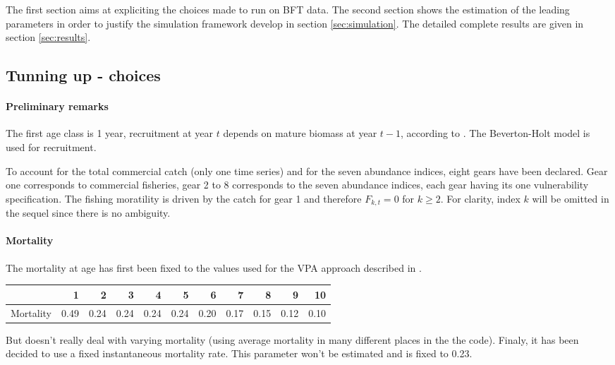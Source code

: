 The first section  aims at expliciting the choices made  to run \iscam
on BFT  data. The second section  shows the estimation of  the leading
parameters in  order to  justify the  simulation framework  develop in
section \ref{sec:simulation}. The detailed  complete results are given
in section \ref{sec:results}.




\subsection{Tunning up \iscam - choices}

\paragraph{Preliminary remarks}
The first age class is 1 year, recruitment at year $t$ depends on
mature  biomass  at  year  $t-1$,  according  to  \cite{tuna2012}.  The
Beverton-Holt model is used for recruitment.


To account for the total commercial catch (only one time series) and
for the seven abundance indices,  eight gears have been declared. Gear
one corresponds  to commercial fisheries,  gear 2 to 8  corresponds to
the seven  abundance indices, each  gear having its  one vulnerability
specification. The fishing moratility is  driven by the catch for gear
1 and  therefore $F_{k,t}=0$ for  $k \geq  2$. For clarity,  index $k$
will be omitted in the sequel since there is no ambiguity.

\paragraph{Mortality}
The mortality at age has first been fixed to  the values used for the VPA approach
described in \cite{tuna2012}. 
\begin{table}[ht]
\centering
\begin{tabular}{rrrrrrrrrrr}
  \hline
 & 1 & 2 & 3 & 4 & 5 & 6 & 7 & 8 & 9 & 10 \\ 
  \hline
Mortality & 0.49 & 0.24 & 0.24 & 0.24 & 0.24 & 0.20 & 0.17 & 0.15 & 0.12 & 0.10 \\ 
   \hline
\end{tabular}
\end{table}
But \iscam doesn't really deal with varying mortality (using average mortality in many different places in the the code). Finaly, it has been decided to use a fixed instantaneous mortality rate.
This parameter won't be estimated and is fixed to 0.23.


